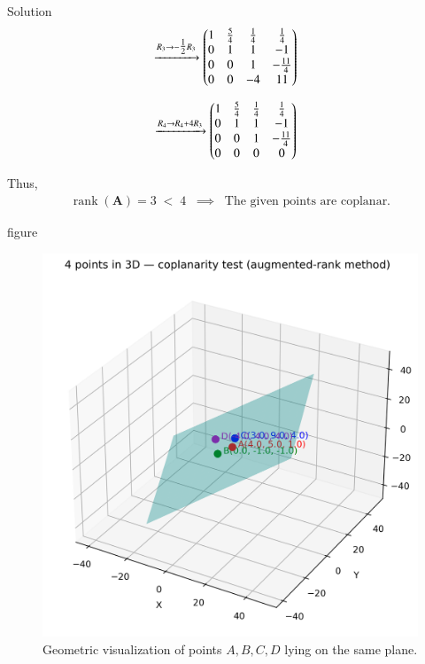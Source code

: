 \documentclass{beamer}
\begin{document}
\begin{frame}{Solution}
\begin{align}
&\xrightarrow{R_3 \to -\tfrac{1}{2}R_3}
\begin{pmatrix}
1 & \tfrac{5}{4} & \tfrac{1}{4} & \tfrac{1}{4} \\
0 & 1 & 1 & -1 \\
0 & 0 & 1 & -\tfrac{11}{4} \\
0 & 0 & -4 & 11
\end{pmatrix}
\end{align}

\begin{align}
&\xrightarrow{R_4 \to R_4 + 4R_3}
\begin{pmatrix}
1 & \tfrac{5}{4} & \tfrac{1}{4} & \tfrac{1}{4} \\
0 & 1 & 1 & -1 \\
0 & 0 & 1 & -\tfrac{11}{4} \\
0 & 0 & 0 & 0
\end{pmatrix}
\end{align}

Thus,
\begin{align}
\operatorname{rank}(\mathbf{A}) = 3 \;<\; 4 \;\;\implies\;\;
\text{The given points are coplanar.}
\end{align}
\end{frame}
\begin{frame}{figure}
\begin{figure}[H]
    \centering
    \includegraphics[width=0.45\linewidth]{figures/points_coplanarity.png}
    \caption{Geometric visualization of points $A, B, C, D$ lying on the same plane.}
    \label{fig:coplanarity}
\end{figure}    
\end{frame}
\end{document}
